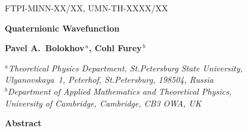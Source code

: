 \documentclass[epsfig,12pt]{article}
\begin{document}
\begin{titlepage}


\begin{flushright}
FTPI-MINN-XX/XX, UMN-TH-XXXX/XX\\
\end{flushright}

\vskip 2cm
\begin{center}
{  \Large \bf  Quaternionic Wavefunction }
\end{center}
\vskip 0.5cm

\begin{center}

 {\large
 \bf   Pavel A.~Bolokhov$^{\,a}$,  Cohl Furey$^{\,b}$
 }
\end {center}

\begin{center}
$^a${\it Theoretical Physics Department, St.Petersburg State University, Ulyanovskaya~1, 
	Peterhof, St.Petersburg, 198504, Russia}\\
$^b${\it Department of Applied Mathematics and Theoretical Physics,\\
	University of Cambridge, Cambridge, CB3 OWA, UK}
\end{center}




\begin{center}
{\large\bf Abstract}
\end{center}


\end{titlepage}
\end{document}

